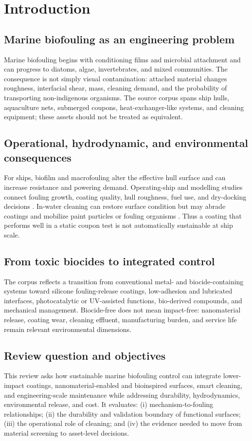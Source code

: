 \section{Introduction}
\subsection{Marine biofouling as an engineering problem}
Marine biofouling begins with conditioning films and microbial attachment and can progress to diatoms, algae, invertebrates, and mixed communities. The consequence is not simply visual contamination: attached material changes roughness, interfacial shear, mass, cleaning demand, and the probability of transporting non-indigenous organisms. The source corpus spans ship hulls, aquaculture nets, submerged coupons, heat-exchanger-like systems, and cleaning equipment; these assets should not be treated as equivalent.

\subsection{Operational, hydrodynamic, and environmental consequences}
For ships, biofilm and macrofouling alter the effective hull surface and can increase resistance and powering demand. Operating-ship and modelling studies connect fouling growth, coating quality, hull roughness, fuel use, and dry-docking decisions \cite{hakim_investigation_2019,hadzic_biofouling_2022,speranza_modelling_2019,wang_drag_2018}. In-water cleaning can restore surface condition but may abrade coatings and mobilize paint particles or fouling organisms \cite{oliveira_ship_2020,kim_qualitative_2024,soon_characterization_2021}. Thus a coating that performs well in a static coupon test is not automatically sustainable at ship scale.

\subsection{From toxic biocides to integrated control}
The corpus reflects a transition from conventional metal- and biocide-containing systems toward silicone fouling-release coatings, low-adhesion and lubricated interfaces, photocatalytic or UV-assisted functions, bio-derived compounds, and mechanical management. Biocide-free does not mean impact-free: nanomaterial release, coating wear, cleaning effluent, manufacturing burden, and service life remain relevant environmental dimensions.

\subsection{Review question and objectives}
This review asks how sustainable marine biofouling control can integrate lower-impact coatings, nanomaterial-enabled and bioinspired surfaces, smart cleaning, and engineering-scale maintenance while addressing durability, hydrodynamics, environmental release, and cost. It evaluates: (i) mechanism-to-fouling relationships; (ii) the durability and validation boundary of functional surfaces; (iii) the operational role of cleaning; and (iv) the evidence needed to move from material screening to asset-level decisions.

